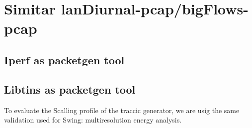 \section{Simitar lanDiurnal-pcap/bigFlows-pcap}


\subsection{Iperf as packetgen tool}


\subsection{Libtins as packetgen tool}



To evaluate the Scalling profile of the traccic generator, we are usig the same validation used for Swing\cite{swing-paper}: multiresolution energy analysis.
